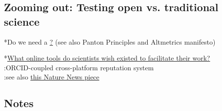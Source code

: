 \documentclass[final,authoryear,3p]{elsarticle-open-drafting}
\begin{document}
\subsection{Zooming out: Testing open vs. traditional science}

*Do we need a \href{http://open-science.pen.io/ manifesto for open science}? (see also Panton Principles and Altmetrics manifesto)

*\href{http://www.quora.com/What-online-tools-do-scientists-wish-existed-to-facilitate-their-work/answer/Marius-Kempe}{What online tools do scientists wish existed to facilitate their work?}\\
:ORCID-coupled cross-platform reputation system\\
:see also \href{http://www.nature.com/news/2011/110511/full/473138a.html}{this Nature News piece}

\subsection{Notes}
\end{document}
